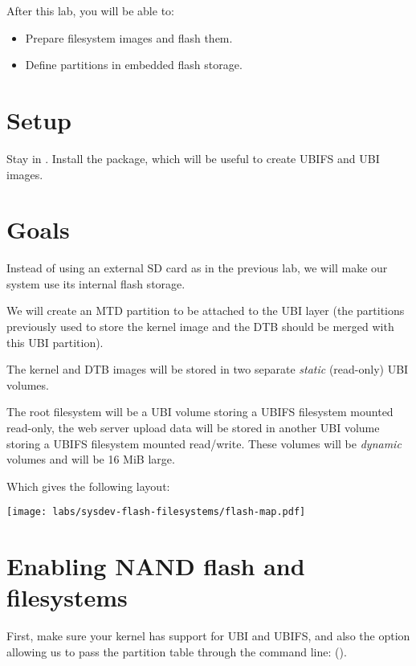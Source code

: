 
After this lab, you will be able to:
\begin{itemize}
\item Prepare filesystem images and flash them.
\item Define partitions in embedded flash storage.
\end{itemize}

\section{Setup}

Stay in . Install the
 package, which will be useful to create UBIFS and
UBI images.

\section{Goals}

Instead of using an external SD card as in the previous lab, we will
make our system use its internal flash storage.

We will create an MTD partition to be attached to the UBI layer (the partitions
previously used to store the kernel image and the DTB should be merged
with this UBI partition).

The kernel and DTB images will be stored in two separate {\em static}
(read-only) UBI volumes.

The root filesystem will be a UBI volume storing a UBIFS filesystem
mounted read-only, the web server upload data will be stored in
another UBI volume storing a UBIFS filesystem mounted
read/write. These volumes will be {\em dynamic} volumes and will be
16 MiB large.

Which gives the following layout:

\begin{center}
  \texttt{[image: labs/sysdev-flash-filesystems/flash-map.pdf]}
\end{center}

\section{Enabling NAND flash and filesystems}

First, make sure your kernel has support for UBI and UBIFS, and also
the option allowing us to pass the partition table through the command
line:
().

